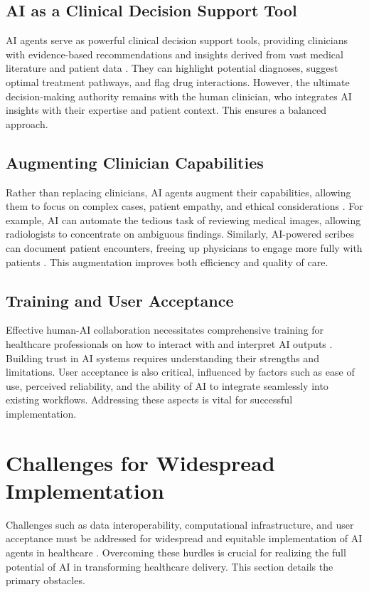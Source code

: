 \documentclass[12pt,a4paper]{article}
\begin{document}
\subsection{AI as a Clinical Decision Support Tool}
AI agents serve as powerful clinical decision support tools, providing clinicians with evidence-based recommendations and insights derived from vast medical literature and patient data \cite{zynxhealth_clinical_decision_support}. They can highlight potential diagnoses, suggest optimal treatment pathways, and flag drug interactions. However, the ultimate decision-making authority remains with the human clinician, who integrates AI insights with their expertise and patient context. This ensures a balanced approach.

\subsection{Augmenting Clinician Capabilities}
Rather than replacing clinicians, AI agents augment their capabilities, allowing them to focus on complex cases, patient empathy, and ethical considerations \cite{nih_ethical_implications}. For example, AI can automate the tedious task of reviewing medical images, allowing radiologists to concentrate on ambiguous findings. Similarly, AI-powered scribes can document patient encounters, freeing up physicians to engage more fully with patients \cite{deepscribe_ai_medical_scribe}. This augmentation improves both efficiency and quality of care.

\subsection{Training and User Acceptance}
Effective human-AI collaboration necessitates comprehensive training for healthcare professionals on how to interact with and interpret AI outputs \cite{relias_healthcare_lms}. Building trust in AI systems requires understanding their strengths and limitations. User acceptance is also critical, influenced by factors such as ease of use, perceived reliability, and the ability of AI to integrate seamlessly into existing workflows. Addressing these aspects is vital for successful implementation.

\section{Challenges for Widespread Implementation}
Challenges such as data interoperability, computational infrastructure, and user acceptance must be addressed for widespread and equitable implementation of AI agents in healthcare \cite{dataart_digital_transformation}. Overcoming these hurdles is crucial for realizing the full potential of AI in transforming healthcare delivery. This section details the primary obstacles.
\end{document}
